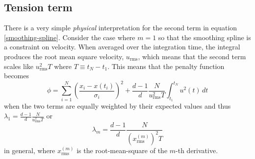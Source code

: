 \documentclass[twocol]{ametsoc}
\begin{document}
\subsection{Tension term}

There is a very simple \emph{physical} interpretation for the second term in equation \ref{smoothing-spline}. Consider the case where $m=1$ so that the smoothing spline is a constraint on velocity. When averaged over the integration time, the integral produces the root mean square velocity, $u_{\textrm{rms}}$, which means that the second term scales like $u_{\textrm{rms}}^2 T$ where $T\equiv t_N-t_1$. This means that the penalty function becomes
\begin{equation}
\label{smoothing-spline-velocity}
\phi =  \sum_{i=1}^{N} \left( \frac{x_i - x(t_i)}{\sigma_i} \right) ^2 + \frac{d-1}{d} \frac{N}{u_{\textrm{rms}}^2 T} \int_{t_1}^{t_N} u^2(t) \, dt
\end{equation}
when the two terms are equally weighted by their expected values and thus $\lambda_1 = \frac{d-1}{d} \frac{N}{u_{\textrm{rms}}^2 T}$ or
\begin{equation}
\label{lambda}
\lambda_m = \frac{d-1}{d} \frac{N}{ \left(x^{(m)}_{\textrm{rms}}\right)^2 T}
\end{equation}
in general, where $x^{(m)}_{\textrm{rms}}$ is the root-mean-square of the $m$-th derivative.
\end{document}
